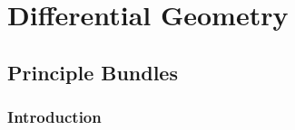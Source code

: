 \documentclass{book}
\begin{document}
\begin{ex}
	
\end{ex}
























































































\part{Differential Geometry}

\chapter{Principle Bundles}

\section{Introduction}
\end{document}
